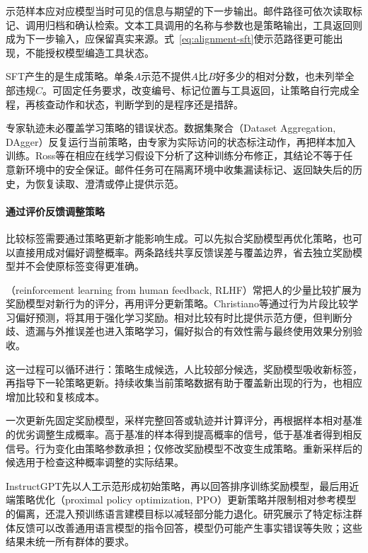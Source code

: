 示范样本应对应模型当时可见的信息与期望的下一步输出。邮件路径可依次读取标记、调用归档和确认检索。文本工具调用的名称与参数也是策略输出，工具返回则成为下一步输入，应保留真实来源。式~\eqref{eq:alignment-sft}使示范路径更可能出现，不能授权模型编造工具状态。

SFT产生的是生成策略。单条$A$示范不提供$A$比$B$好多少的相对分数，也未列举全部违规$C$。可固定任务要求，改变编号、标记位置与工具返回，让策略自行完成全程，再核查动作和状态，判断学到的是程序还是措辞。

专家轨迹未必覆盖学习策略的错误状态。数据集聚合（Dataset Aggregation, DAgger）反复运行当前策略，由专家为实际访问的状态标注动作，再把样本加入训练。Ross等在相应在线学习假设下分析了这种训练分布修正，其结论不等于任意新环境中的安全保证。邮件任务可在隔离环境中收集漏读标记、返回缺失后的历史，为恢复读取、澄清或停止提供示范。

\paragraph{通过评价反馈调整策略}

比较标签需要通过策略更新才能影响生成。可以先拟合奖励模型再优化策略，也可以直接用成对偏好调整概率。两条路线共享反馈误差与覆盖边界，省去独立奖励模型并不会使原标签变得更准确。

（reinforcement learning from human feedback, RLHF）常把人的少量比较扩展为奖励模型对新行为的评分，再用评分更新策略。Christiano等通过行为片段比较学习偏好预测，将其用于强化学习奖励。相对比较有时比提供示范方便，但判断分歧、遗漏与外推误差也进入策略学习，偏好拟合的有效性需与最终使用效果分别验收。

这一过程可以循环进行：策略生成候选，人比较部分候选，奖励模型吸收新标签，再指导下一轮策略更新。持续收集当前策略数据有助于覆盖新出现的行为，也相应增加比较和复核成本。

一次更新先固定奖励模型，采样完整回答或轨迹并计算评分，再根据样本相对基准的优劣调整生成概率。高于基准的样本得到提高概率的信号，低于基准者得到相反信号。行为变化由策略参数承担；仅修改奖励模型不改变生成策略。重新采样后的候选用于检查这种概率调整的实际结果。

InstructGPT先以人工示范形成初始策略，再以回答排序训练奖励模型，最后用近端策略优化（proximal policy optimization, PPO）更新策略并限制相对参考模型的偏离，还混入预训练语言建模目标以减轻部分能力退化。研究展示了特定标注群体反馈可以改善通用语言模型的指令回答，模型仍可能产生事实错误等失败；这些结果未统一所有群体的要求。

